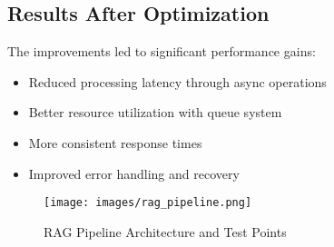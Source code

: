 \subsection{Results After Optimization}
The improvements led to significant performance gains:

\begin{itemize}
    \item Reduced processing latency through async operations
    \item Better resource utilization with queue system
    \item More consistent response times
    \item Improved error handling and recovery
\end{itemize}

\begin{figure}[H]
    \centering
    \texttt{[image: images/rag\_pipeline.png]}
    \caption{RAG Pipeline Architecture and Test Points}
\end{figure} 
